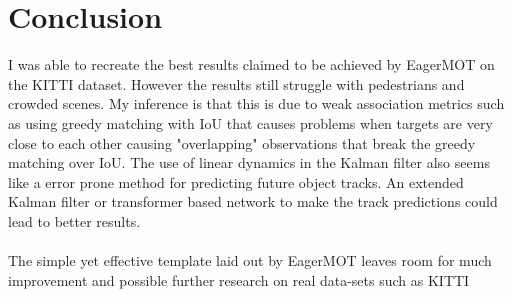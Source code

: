 \documentclass{article}
\begin{document}
\section{Conclusion}
I was able to recreate the best results claimed to be achieved by EagerMOT \cite{Kim21ICRA} on the KITTI dataset. However the results still struggle with pedestrians and crowded scenes. My inference is that this is due to weak association metrics such as using greedy matching with IoU that causes problems when targets are very close to each other causing "overlapping" observations that break the greedy matching over IoU. The use of linear dynamics in the Kalman filter also seems like a error prone method for predicting future object tracks. An extended Kalman filter or transformer based network to make the track predictions could lead to better results.\\\\
The simple yet effective template laid out by EagerMOT leaves room for much improvement and possible further research on real data-sets such as KITTI \cite{Geiger2012CVPR}



\end{document}
